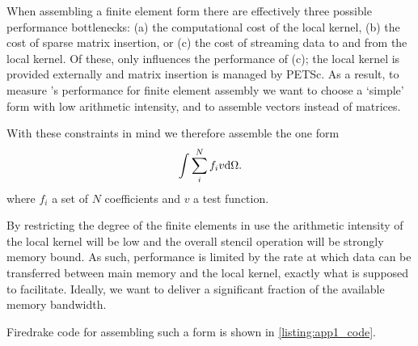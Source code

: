 \documentclass[thesis]{subfiles}
\begin{document}


When assembling a finite element form there are effectively three possible performance bottlenecks:
(a) the computational cost of the local kernel,
(b) the cost of sparse matrix insertion, or
(c) the cost of streaming data to and from the local kernel.
Of these,  only influences the performance of (c); the local kernel is provided externally and matrix insertion is managed by PETSc.
As a result, to measure 's performance for finite element assembly we want to choose a `simple' form with low arithmetic intensity, and to assemble vectors instead of matrices.

With these constraints in mind we therefore assemble the one form
\begin{equation}
  \label{eq:app1_form}
  \int \sum_i^N f_i v \textnormal{d}\Omega.
\end{equation}
where $f_i$ a set of $N$ coefficients and $v$ a test function.

By restricting the degree of the finite elements in use the arithmetic intensity of the local kernel will be low and the overall stencil operation will be strongly memory bound.
As such, performance is limited by the rate at which data can be transferred between main memory and the local kernel, exactly what  is supposed to facilitate.
Ideally, we want  to deliver a significant fraction of the available memory bandwidth.

Firedrake code for assembling such a form is shown in \cref{listing:app1_code}.




\end{document}
